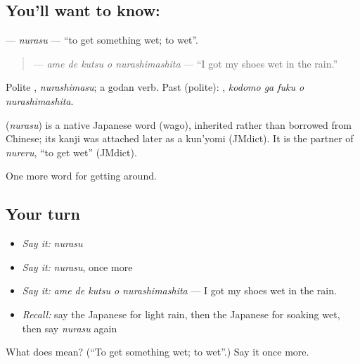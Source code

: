 \subsection*{You'll want to know: }
\textbf{} — \emph{nurasu} — \textquotedblleft{}to get something wet; to wet\textquotedblright{}.

\begin{quote}
\textbf{  } — \emph{ame de kutsu o nurashimashita} — \textquotedblleft{}I got my shoes wet in the rain.\textquotedblright{}
\end{quote}

Polite \textbf{}, \emph{nurashimasu}; a godan verb. Past (polite): \textbf{  }, \emph{kodomo ga fuku o nurashimashita}.

\begin{cousinweb}
\textbf{} (\emph{nurasu}) is a native Japanese word (wago), inherited rather than borrowed from Chinese; its kanji was attached later as a kun'yomi (JMdict). It is the partner of \emph{nureru}, \textquotedblleft{}to get wet\textquotedblright{} (JMdict).
\end{cousinweb}

\begin{grammarlens}[title={What you've built}]
One more word for getting around.
\end{grammarlens}

\subsection*{Your turn}
\begin{itemize}
\raggedright
  \item \emph{Say it:} \emph{nurasu}
  \item \emph{Say it:} \emph{nurasu}, once more
  \item \emph{Say it:} \emph{ame de kutsu o nurashimashita} — I got my shoes wet in the rain.
  \item \emph{Recall:} say the Japanese for light rain, then the Japanese for soaking wet, then say \emph{nurasu} again
\end{itemize}

\begin{tcolorbox}[breakable,colback=teal!4,colframe=teal!35!black,title={Before you move on}]
What does  mean? (\textquotedblleft{}To get something wet; to wet\textquotedblright{}.) Say it once more.
\end{tcolorbox}
